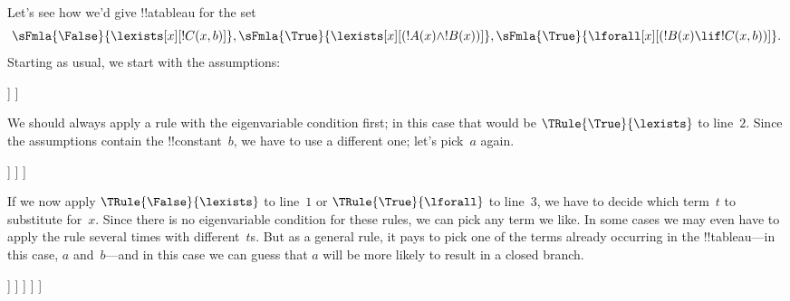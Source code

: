\documentclass[../../../include/open-logic-section]{subfiles}
\begin{document}
\begin{ex}
Let's see how we'd give !!a{tableau} for the set
\[
\sFmla{\False}{\lexists[x][!C(x,b)]},
\sFmla{\True}{\lexists[x][(!A(x) \land !B(x))]},
\sFmla{\True}{\lforall[x][(!B(x) \lif !C(x,b))]}.
\]
Starting as usual, we start with the assumptions:
\begin{oltableau}
  [\sFmla{\False}{\lexists[x][\formula{C}(x,b)]}, just=\TAss
    [\sFmla{\True}{\lexists[x][(\formula{A}(x) \land \formula{B}(x))]},
      just=\TAss
      [\sFmla{\True}{\lforall[x][(\formula{B}(x) \lif \formula{C}(x,b))]},
        just=\TAss]
    ]
  ]
\end{oltableau}
We should always apply a rule with the eigenvariable condition first;
in this case that would be $\TRule{\True}{\lexists}$ to
line~$2$. Since the assumptions contain the !!{constant}~$b$, we have
to use a different one; let's pick~$a$ again.
\begin{oltableau}
  [\sFmla{\False}{\lexists[x][\formula{C}(x,b)]}, just=\TAss
    [\sFmla{\True}{\lexists[x][(\formula{A}(x) \land \formula{B}(x))]},
      just=\TAss, checked
      [\sFmla{\True}{\lforall[x][(\formula{B}(x) \lif \formula{C}(x,b))]},
        just=\TAss
        [\sFmla{\True}{\formula{A}(a) \land \formula{B}(a)},
          just={\TRule{\True}{\lexists}[2]}]
      ]
    ]
  ]
\end{oltableau}
If we now apply $\TRule{\False}{\lexists}$ to line~$1$ or
$\TRule{\True}{\lforall}$ to line~$3$, we have to decide which term~$t$
to substitute for~$x$. Since there is no eigenvariable condition for
these rules, we can pick any term we like. In some cases we may even
have to apply the rule several times with different~$t$s. But as a
general rule, it pays to pick one of the terms already occurring in the
!!{tableau}---in this case, $a$ and~$b$---and in this case we can
guess that $a$ will be more likely to result in a closed branch.
\begin{oltableau}
  [\sFmla{\False}{\lexists[x][\formula{C}(x,b)]}, just=\TAss
    [\sFmla{\True}{\lexists[x][(\formula{A}(x) \land \formula{B}(x))]},
      just=\TAss, checked
      [\sFmla{\True}{\lforall[x][(\formula{B}(x) \lif \formula{C}(x,b))]}, just=\TAss
        [\sFmla{\True}{\formula{A}(a) \land \formula{B}(a)}, just={\TRule{\True}{\lexists}[2]}
          [\sFmla{\False}{\formula{C}(a,b)}, just={\TRule{\False}{\lexists}[1]}
            [\sFmla{\True}{\formula{B}(a) \lif \formula{C}(a,b)},
              just={\TRule{\True}{\lforall}[3]}
            ]
          ]
        ]
      ]
    ]
  ]
\end{oltableau}

\end{ex}
\end{document}
